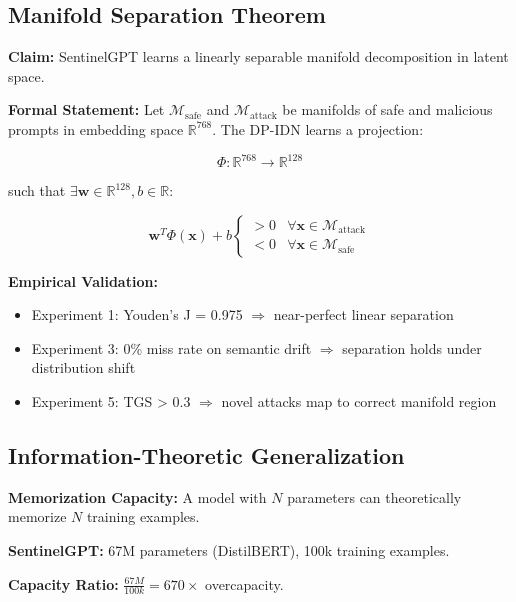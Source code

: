 \documentclass[11pt,twocolumn]{article}
\begin{document}
\subsection{Manifold Separation Theorem}

\textbf{Claim:} SentinelGPT learns a linearly separable manifold decomposition in latent space.

\textbf{Formal Statement:} Let $\mathcal{M}_{\text{safe}}$ and $\mathcal{M}_{\text{attack}}$ be manifolds of safe and malicious prompts in embedding space $\mathbb{R}^{768}$. The DP-IDN learns a projection:

\begin{equation}
\Phi: \mathbb{R}^{768} \to \mathbb{R}^{128}
\end{equation}

such that $\exists \mathbf{w} \in \mathbb{R}^{128}, b \in \mathbb{R}$:

\begin{equation}
\mathbf{w}^T \Phi(\mathbf{x}) + b 
\begin{cases}
> 0 & \forall \mathbf{x} \in \mathcal{M}_{\text{attack}} \\
< 0 & \forall \mathbf{x} \in \mathcal{M}_{\text{safe}}
\end{cases}
\end{equation}

\textbf{Empirical Validation:}
\begin{itemize}[noitemsep]
    \item Experiment 1: Youden's J = 0.975 $\Rightarrow$ near-perfect linear separation
    \item Experiment 3: 0\% miss rate on semantic drift $\Rightarrow$ separation holds under distribution shift
    \item Experiment 5: TGS > 0.3 $\Rightarrow$ novel attacks map to correct manifold region
\end{itemize}

\subsection{Information-Theoretic Generalization}

\textbf{Memorization Capacity:} A model with $N$ parameters can theoretically memorize $N$ training examples.

\textbf{SentinelGPT:} 67M parameters (DistilBERT), 100k training examples.

\textbf{Capacity Ratio:} $\frac{67M}{100k} = 670\times$ overcapacity.
\end{document}
